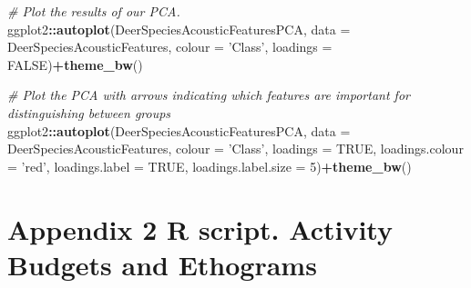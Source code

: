 \documentclass[]{book}
\newenvironment{Shaded}{\begin{snugshade}}{\end{snugshade}}
\newcommand{\CommentTok}[1]{\textcolor[rgb]{0.56,0.35,0.01}{\textit{#1}}}
\newcommand{\DataTypeTok}[1]{\textcolor[rgb]{0.13,0.29,0.53}{#1}}
\newcommand{\DecValTok}[1]{\textcolor[rgb]{0.00,0.00,0.81}{#1}}
\newcommand{\KeywordTok}[1]{\textcolor[rgb]{0.13,0.29,0.53}{\textbf{#1}}}
\newcommand{\NormalTok}[1]{#1}
\newcommand{\OperatorTok}[1]{\textcolor[rgb]{0.81,0.36,0.00}{\textbf{#1}}}
\newcommand{\OtherTok}[1]{\textcolor[rgb]{0.56,0.35,0.01}{#1}}
\newcommand{\StringTok}[1]{\textcolor[rgb]{0.31,0.60,0.02}{#1}}
\begin{document}
\begin{Shaded}
\begin{Highlighting}[]
\CommentTok{# Plot the results of our PCA.}
\NormalTok{ggplot2}\OperatorTok{::}\KeywordTok{autoplot}\NormalTok{(DeerSpeciesAcousticFeaturesPCA, }\DataTypeTok{data =}\NormalTok{ DeerSpeciesAcousticFeatures, }\DataTypeTok{colour =} \StringTok{'Class'}\NormalTok{,}
         \DataTypeTok{loadings =} \OtherTok{FALSE}\NormalTok{)}\OperatorTok{+}\KeywordTok{theme_bw}\NormalTok{()}

\CommentTok{# Plot the PCA with arrows indicating which features are important for distinguishing between groups}
\NormalTok{ggplot2}\OperatorTok{::}\KeywordTok{autoplot}\NormalTok{(DeerSpeciesAcousticFeaturesPCA, }\DataTypeTok{data =}\NormalTok{ DeerSpeciesAcousticFeatures, }\DataTypeTok{colour =} \StringTok{'Class'}\NormalTok{,}
         \DataTypeTok{loadings =} \OtherTok{TRUE}\NormalTok{, }\DataTypeTok{loadings.colour =} \StringTok{'red'}\NormalTok{,}
         \DataTypeTok{loadings.label =} \OtherTok{TRUE}\NormalTok{,}
         \DataTypeTok{loadings.label.size =} \DecValTok{5}\NormalTok{)}\OperatorTok{+}\KeywordTok{theme_bw}\NormalTok{()}
\end{Highlighting}
\end{Shaded}

\hypertarget{appendix-2-r-script.-activity-budgets-and-ethograms}{%
\chapter*{Appendix 2 R script. Activity Budgets and Ethograms}\label{appendix-2-r-script.-activity-budgets-and-ethograms}}
\end{document}

